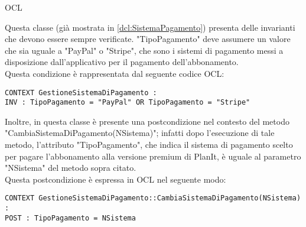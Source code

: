 \begin{listaPersonale}{OCL}
    \begin{center}
        
    \end{center}
    Questa classe (già mostrata in \ref{dcl:SistemaPagamento}) presenta delle invarianti che devono essere sempre verificate. "TipoPagamento" deve assumere un valore che sia uguale a "PayPal" o "Stripe", che sono i sistemi di pagamento messi a disposizione dall'applicativo per il pagamento dell'abbonamento. \\
    Questa condizione è rappresentata dal seguente codice OCL:
    \begin{lstlisting}
CONTEXT GestioneSistemaDiPagamento :
INV : TipoPagamento = "PayPal" OR TipoPagamento = "Stripe"
    \end{lstlisting}        Inoltre, in questa classe è presente una postcondizione nel contesto del metodo "CambiaSistemaDiPagamento(NSistema)"; infatti dopo l'esecuzione di tale metodo, l'attributo "TipoPagamento", che indica il sistema di pagamento scelto per pagare l'abbonamento alla versione premium di PlanIt, è uguale al parametro "NSistema" del metodo sopra citato. \\
    Questa postcondizione è espressa in OCL nel seguente modo:
    \begin{lstlisting}
CONTEXT GestioneSistemaDiPagamento::CambiaSistemaDiPagamento(NSistema) :
POST : TipoPagamento = NSistema
    \end{lstlisting}





\end{listaPersonale}
